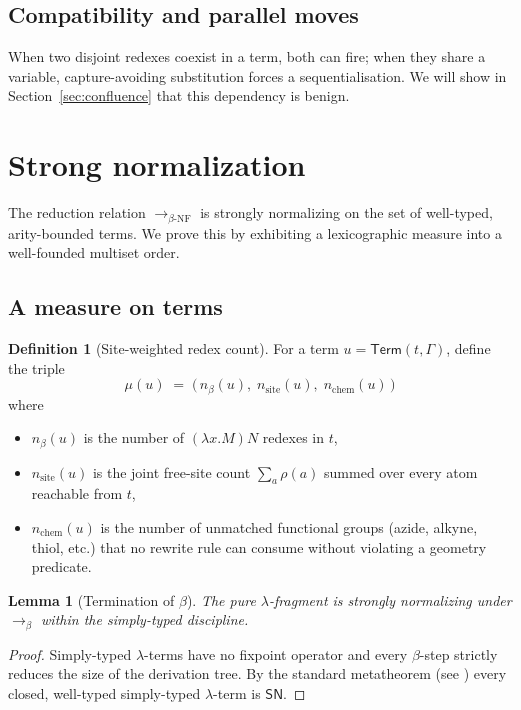 \documentclass{article}
\newtheorem{lemma}[theorem]{Lemma}
\theoremstyle{definition}
\newtheorem{definition}[theorem]{Definition}
\newcommand{\bnf}{\beta\text{-NF}}
\newcommand{\sn}{\mathsf{SN}}
\newcommand{\stepstoBeta}{\longrightarrow_{\beta}}
\newcommand{\stepstoAll}{\longrightarrow_{\bnf}}
\begin{document}
\subsection{Compatibility and parallel moves}
When two disjoint redexes coexist in a term, both can fire; when they share a
variable, capture-avoiding substitution forces a sequentialisation. We will
show in Section~\ref{sec:confluence} that this dependency is benign.

\section{Strong normalization}
\label{sec:sn}
The reduction relation $\stepstoAll$ is strongly normalizing on the set of
well-typed, arity-bounded terms. We prove this by exhibiting a
lexicographic measure into a well-founded multiset order.

\subsection{A measure on terms}

\begin{definition}[Site-weighted redex count]
\label{def:measure}
For a term $u = \mathsf{Term}(t,\Gamma)$, define the triple
\[
  \mu(u) \;=\; \bigl(\, n_\beta(u),\; n_{\text{site}}(u),\; n_{\text{chem}}(u) \,\bigr)
\]
where
\begin{itemize}
  \item $n_\beta(u)$ is the number of $(\lambda x.M)N$ redexes in $t$,
  \item $n_{\text{site}}(u)$ is the joint free-site count
        $\sum_a \rho(a)$ summed over every atom reachable from $t$,
  \item $n_{\text{chem}}(u)$ is the number of unmatched functional groups
        (azide, alkyne, thiol, etc.) that no rewrite rule can consume
        without violating a geometry predicate.
\end{itemize}
\end{definition}

\begin{lemma}[Termination of $\beta$]
\label{lem:beta-sn}
The pure $\lambda$-fragment is strongly normalizing under $\stepstoBeta$
within the simply-typed discipline.
\end{lemma}
\begin{proof}
Simply-typed $\lambda$-terms have no fixpoint operator and every $\beta$-step
strictly reduces the size of the derivation tree. By the standard
metatheorem (see \cite[Chapter~6]{Pierce2002}) every closed, well-typed
simply-typed $\lambda$-term is $\sn$.
\end{proof}
\end{document}
